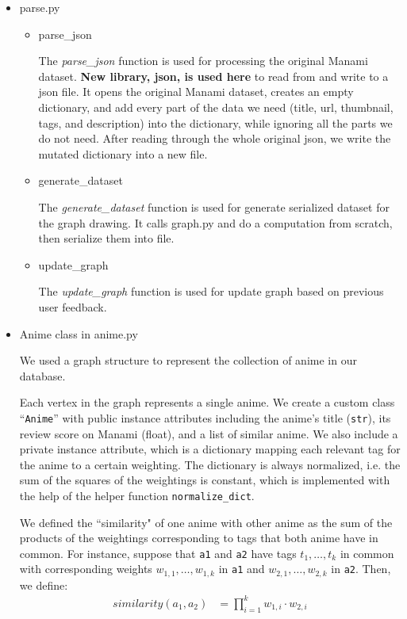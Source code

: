 \documentclass[12pt]{article}
\begin{document}
\begin{enumerate}
\begin{text}
\begin{itemize}
    \item parse.py
    \begin{itemize}
        \item parse\_json
        
            The \emph{parse\_json} function is used for processing the original Manami dataset. \textbf{New library, json, is used here} to read from and write to a json file. It opens the original Manami dataset, creates an empty dictionary, and add every part of the data we need (title, url, thumbnail, tags, and description) into the dictionary, while ignoring all the parts we do not need. After reading through the whole original json, we write the mutated dictionary into a new file.
            
        \item generate\_dataset
        
            The \emph{generate\_dataset} function is used for generate serialized dataset for the graph drawing. It calls graph.py and do a computation from scratch, then serialize them into file.
            
        \item update\_graph
        
            The \emph{update\_graph} function is used for update graph based on previous user feedback.
    \end{itemize}

    
    \item Anime class in anime.py
    
    We used a graph structure to represent the collection of anime in our database. 
    
    Each vertex in the graph represents a single anime. We create a custom class “\texttt{Anime}” with public instance attributes including the anime's title (\texttt{str}), its review score on Manami (float), and a list of similar anime. We also include a private instance attribute, which is a dictionary mapping each relevant tag for the anime to a certain weighting. The dictionary is always normalized, i.e. the sum of the squares of the weightings is constant, which is implemented with the help of the helper function \texttt{normalize\_dict}. 
    
    We defined the ``similarity" of one anime with other anime as the sum of the products of the weightings corresponding to tags that both anime have in common. For instance, suppose that \texttt{a1} and \texttt{a2} have tags $t_1, \ldots, t_k$ in common with corresponding weights $w_{1,1}, \ldots, w_{1,k}$ in \texttt{a1} and $w_{2,1}, \ldots, w_{2,k}$ in \texttt{a2}. Then, we define:
    \begin{align*}
        similarity(a_1, a_2) &= \prod_{i=1}^k w_{1, i} \cdot w_{2, i}
    \end{align*}
    

\end{itemize}
\end{text}
\end{enumerate}
\end{document}
